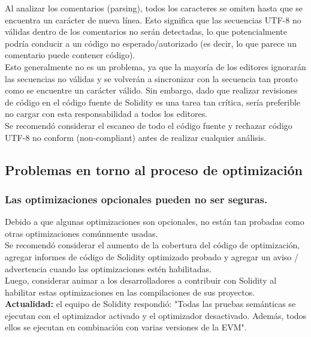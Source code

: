 Al analizar los comentarios (parsing), todos los caracteres se omiten hasta que se encuentra un carácter de nueva línea. Esto significa que las secuencias UTF-8 no válidas dentro de los comentarios no serán detectadas, lo que potencialmente podría conducir a un código no esperado/autorizado (es decir, lo que parece un comentario puede contener código).\\

Esto generalmente no es un problema, ya que la mayoría de los editores ignorarán las secuencias no válidas y se volverán a sincronizar con la secuencia tan pronto como se encuentre un carácter válido. Sin embargo, dado que realizar revisiones de código en el código fuente de Solidity es una tarea tan crítica, sería preferible no cargar con esta responsabilidad a todos los editores.\\

Se recomendó considerar el escaneo de todo el código fuente y rechazar código UTF-8 no conform (non-compliant) antes de realizar cualquier análisis.\\

\subsection{Problemas en torno al proceso de optimización}

\subsubsection{Las optimizaciones opcionales pueden no ser seguras.}

Debido a que algunas optimizaciones son opcionales, no están tan probadas como otras optimizaciones comúnmente usadas.\\

Se recomendó considerar el aumento de la cobertura del código de optimización, agregar informes de código de Solidity optimizado probado y agregar un aviso / advertencia cuando las optimizaciones estén habilitadas.\\

Luego, considerar animar a los desarrolladores a contribuir con Solidity al habilitar estas optimizaciones en las compilaciones de sus proyectos.\\

\textbf{Actualidad:} el equipo de Solidity respondió: "Todas las pruebas semánticas se ejecutan con el optimizador activado y el optimizador desactivado. Además, todos ellos se ejecutan en combinación con varias versiones de la EVM".\\

